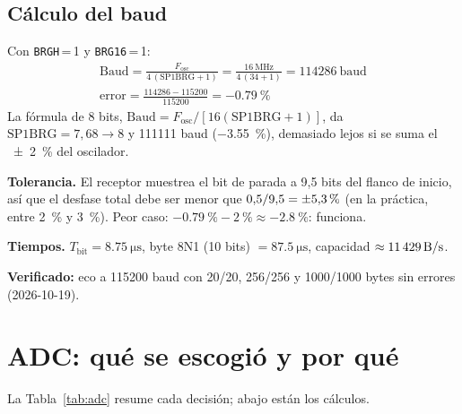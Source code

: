 \documentclass[11pt,letterpaper]{article}
\begin{document}
\subsection{Cálculo del baud}
Con \texttt{BRGH}\,=\,1 y \texttt{BRG16}\,=\,1:
\begin{gather}
  \text{Baud} = \frac{F_\text{osc}}{4\,(\text{SP1BRG}+1)} = \frac{\SI{16}{\mega\hertz}}{4\,(34+1)} = \num{114286}\ \text{baud} \\[2pt]
  \text{error} = \frac{\num{114286} - \num{115200}}{\num{115200}} = \SI{-0.79}{\percent}
\end{gather}
La fórmula de 8 bits, $\text{Baud} = F_\text{osc}/[16(\text{SP1BRG}+1)]$, da $\text{SP1BRG} = 7{,}68 \rightarrow 8$ y \num{111111} baud (\SI{-3.55}{\percent}), demasiado lejos si se suma el \SI{+-2}{\percent} del oscilador.

\textbf{Tolerancia.} El receptor muestrea el bit de parada a 9,5 bits del flanco de inicio, así que el desfase total debe ser menor que $0{,}5/9{,}5 = \SI{+-5.3}{\percent}$ (en la práctica, entre \SI{2}{\percent} y \SI{3}{\percent}). Peor caso: $\SI{-0.79}{\percent} - \SI{2}{\percent} \approx \SI{-2.8}{\percent}$: funciona.

\textbf{Tiempos.} $T_\text{bit} = \SI{8.75}{\micro\second}$, byte 8N1 (10 bits) $= \SI{87.5}{\micro\second}$, capacidad $\approx \SI{11429}{\byte\per\second}$.

\textbf{Verificado:} eco a \num{115200} baud con 20/20, 256/256 y 1000/1000 bytes sin errores (2026-10-19).



\section{ADC: qué se escogió y por qué}

La Tabla~\ref{tab:adc} resume cada decisión; abajo están los cálculos.
\end{document}
